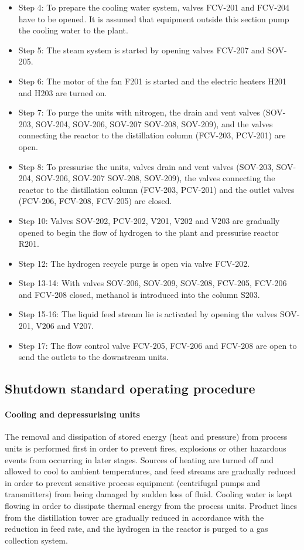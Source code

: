 \begin{itemize}
    \item Step 4: To prepare the cooling water system, valves FCV-201 and FCV-204 have to be opened. It is assumed that equipment outside this section pump the cooling water to the plant.
    \item Step 5: The steam system is started by opening valves FCV-207 and SOV-205.
    \item Step 6: The motor of the fan F201 is started and the electric heaters H201 and H203 are turned on. 
    \item Step 7: To purge the units with nitrogen, the drain and vent valves (SOV-203, SOV-204, SOV-206, SOV-207 SOV-208, SOV-209), and the valves connecting the reactor to the distillation column  (FCV-203, PCV-201) are open. 
    \item Step 8: To pressurise the units, valves drain and vent valves (SOV-203, SOV-204, SOV-206, SOV-207 SOV-208, SOV-209), the valves connecting the reactor to the distillation column (FCV-203, PCV-201) and the outlet valves (FCV-206, FCV-208, FCV-205) are closed. 
    \item Step 10: Valves SOV-202, PCV-202, V201, V202 and V203 are gradually opened to begin the flow of hydrogen to the plant and pressurise reactor R201.
    \item Step 12: The hydrogen recycle purge is open via valve FCV-202.
    \item Step 13-14: With valves SOV-206, SOV-209, SOV-208, FCV-205, FCV-206 and FCV-208 closed, methanol is introduced into the column S203.
    \item Step 15-16: The liquid feed stream lie is activated by opening the valves SOV-201, V206 and V207.
    \item Step 17: The flow control valve FCV-205, FCV-206 and FCV-208 are open to send the outlets to the downstream units.
\end{itemize}


\subsection{Shutdown standard operating procedure}

\paragraph{Cooling and depressurising units}
The removal and dissipation of stored energy (heat and pressure) from process units is performed first in order to prevent fires, explosions or other hazardous events from occurring in later stages. Sources of heating are turned off and allowed to cool to ambient temperatures, and feed streams are gradually reduced in order to prevent sensitive process equipment (centrifugal pumps and transmitters) from being damaged by sudden loss of fluid. Cooling water is kept flowing in order to dissipate thermal energy from the process units. Product lines from the distillation tower are gradually reduced in accordance with the reduction in feed rate, and the hydrogen in the reactor is purged to a gas collection system.


